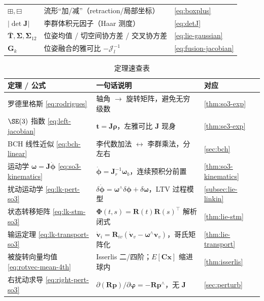 \begin{table}[H]
\begin{tabular}{lll}
$\boxplus,\boxminus$ & 流形“加/减”（retraction/局部坐标） & \cref{eq:boxplus} \\
$|\det\mathbf{J}|$ & 李群体积元因子（Haar 测度） & \cref{eq:detJ} \\
$\bar{\mathbf{T}},\boldsymbol{\Sigma},\boldsymbol{\Sigma}_{12}$ & 位姿均值 / 切空间协方差 / 交叉协方差 & \cref{eq:lie-gaussian} \\
$\mathbf{G}_k$ & 位姿融合的雅可比 $-\boldsymbol{\mathcal{J}}_l^{-1}$ & \cref{eq:fusion-jacobian} \\
\bottomrule
\end{tabular}
\end{table}

\begin{table}[H]\centering\small
\caption{定理速查表}
\begin{tabular}{lll}
\toprule
定理 / 公式 & 一句话说明 & 对应 \\
\midrule
罗德里格斯 \cref{eq:rodrigues} & 轴角 $\to$ 旋转矩阵，避免无穷级数 & \cref{thm:so3-exp} \\
$\SE(3)$ 指数 \cref{eq:left-jacobian} & $\mathbf{t}=\mathbf{J}\boldsymbol{\rho}$，左雅可比 $\mathbf{J}$ 现身 & \cref{thm:se3-exp} \\
BCH 线性近似 \cref{eq:bch-linear} & 李代数加法 $\leftrightarrow$ 李群乘法，分左右 & \cref{sec:bch} \\
运动学 $\boldsymbol{\omega}=\mathbf{J}\dot{\boldsymbol{\phi}}$ \cref{eq:so3-kinematics} & $\dot{\boldsymbol{\phi}}=\mathbf{J}_r^{-1}\boldsymbol{\omega}_b$，连续预积分前置 & \cref{thm:so3-kinematics} \\
扰动运动学 \cref{eq:lk-pert-so3} & $\delta\dot{\boldsymbol{\phi}}=\boldsymbol{\omega}^\wedge\delta\boldsymbol{\phi}+\delta\boldsymbol{\omega}$，LTV 过程模型 & \cref{subsec:lie-linkin} \\
状态转移矩阵 \cref{eq:lk-stm-so3} & $\boldsymbol{\Phi}(t,s)=\mathbf{R}(t)\mathbf{R}(s)^\top$ 解析闭式 & \cref{thm:lie-stm} \\
输运定理 \cref{eq:lk-transport-so3} & $\dot{\mathbf{v}}_i=\mathbf{R}_{iv}(\dot{\mathbf{v}}_v-\boldsymbol{\omega}^\wedge\mathbf{v}_v)$，哥氏矩阵化 & \cref{thm:lie-transport} \\
被旋转向量均值 \cref{eq:rotvec-mean-4th} & Isserlis 二/四阶；$E[\mathbf{C}\mathbf{x}]$ 缩进球内 & \cref{thm:isserlis} \\
右扰动求导 \cref{eq:right-pert-so3} & $\partial(\mathbf{R}\mathbf{p})/\partial\boldsymbol{\varphi}=-\mathbf{R}\mathbf{p}^\wedge$，无 $\mathbf{J}$ & \cref{sec:perturb} \\

\end{tabular}
\end{table}
